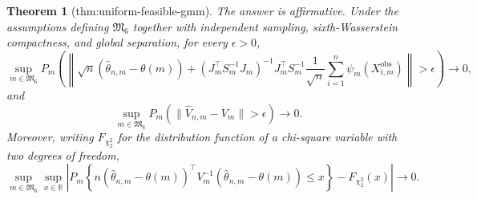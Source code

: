 \documentclass{article}
\newtheorem{theorem}{Theorem}
\begin{document}
\begin{theorem}[thm:uniform-feasible-gmm]\label{thm:uniform-feasible-gmm}
The answer is affirmative. Under the assumptions defining \(\mathfrak M_6\) together with independent sampling, sixth-Wasserstein compactness, and global separation, for every \(\epsilon>0\),
\[
\sup_{m\in\mathfrak M_6}P_m\!\left(\left\|\sqrt n(\widehat\theta_{n,m}-\theta(m))+(J_m^\top S_m^{-1}J_m)^{-1}J_m^\top S_m^{-1}\frac1{\sqrt n}\sum_{i=1}^n\psi_m(X_{i,m}^{\mathrm{obs}})\right\|>\epsilon\right)\longrightarrow0,
\]
and
\[
\sup_{m\in\mathfrak M_6}P_m\!\left(\|\widehat V_{n,m}-V_m\|>\epsilon\right)\longrightarrow0.
\]
Moreover, writing \(F_{\chi^2_2}\) for the distribution function of a chi-square variable with two degrees of freedom,
\[
\sup_{m\in\mathfrak M_6}\sup_{x\in\mathbb R}
\left|P_m\!\left\{n(\widehat\theta_{n,m}-\theta(m))^\top V_m^{-1}(\widehat\theta_{n,m}-\theta(m))\le x\right\}-F_{\chi^2_2}(x)\right|\longrightarrow0.
\]
\end{theorem}
\end{document}
